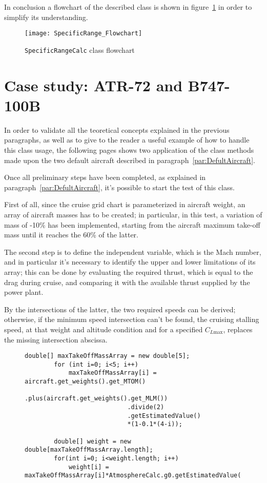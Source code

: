 \bigskip
\noindent
In conclusion a flowchart of the described class is shown in figure~\ref{fig:Figure7} in order to simplify its understanding.

\begin{figure}[t]
\centering
\texttt{[image: SpecificRange\_Flowchart]}
\caption{\lstinline[language=Java]!SpecificRangeCalc! class flowchart}
\label{fig:Figure7}
\end{figure}

\section{Case study: ATR-72 and B747-100B}

In order to validate all the teoretical concepts explained in the previous paragraphs, as well as to give to the reader a useful example of how to handle this class usage, the following pages shows two application of the class methods made upon the two default aircraft described in paragraph~\ref{par:DefultAircraft}.

\bigskip
\noindent
Once all preliminary steps have been completed, as explained in paragraph~\ref{par:DefultAircraft}, it's possible to start the test of this class. 

First of all, since the cruise grid chart is parameterized in aircraft weight, an array of aircraft masses has to be created; in particular, in this test, a variation of mass of -10\% has been implemented, starting from the aircraft maximum take-off mass until it reaches the 60\% of the latter. 

The second step is to define the independent variable, which is the Mach number, and in particular it's necessary to identify the upper and lower limitations of its array; this can be done by evaluating the required thrust, which is equal to the drag during cruise, and comparing it with the available thrust supplied by the power plant.

\noindent
By the intersections of the latter, the two required speeds can be derived; otherwise, if the minimum speed intersection can't be found, the cruising stalling speed, at that weight and altitude condition and for a specified $C_{L\text{max}}$, replaces the missing intersection abscissa.

\begin{figure}[t]
\begin{lstlisting}[caption={Mass variation in Specific Range test - B747-100B}, captionpos=b, tabsize=2]
		double[] maxTakeOffMassArray = new double[5];
		for (int i=0; i<5; i++)
			maxTakeOffMassArray[i] =	aircraft.get_weights().get_MTOM()
							.plus(aircraft.get_weights().get_MLM())
							.divide(2)
							.getEstimatedValue()
							*(1-0.1*(4-i));

		double[] weight = new double[maxTakeOffMassArray.length];
		for(int i=0; i<weight.length; i++)
			weight[i] = maxTakeOffMassArray[i]*AtmosphereCalc.g0.getEstimatedValue();
\end{lstlisting}
\end{figure}

